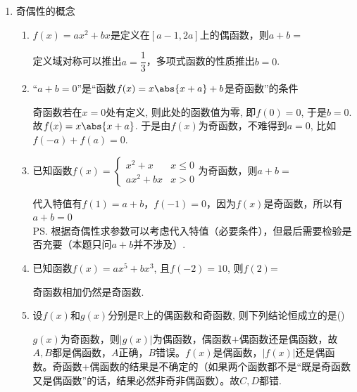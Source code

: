 \begin{enumerate}
\begin{enumerate}
\begin{jieda}
\begin{enumerate}
    \item $y=\dfrac{(x^2+1)^2-(x^2+1)+5}{(x^2+1)^2}=1 - \dfrac{1}{(x^2+1)} + \dfrac{5}{(x^2+1)^2}$. \\
    令$t = \dfrac{1}{(x^2+1)}, t \in (0, 1]$，故$y = 5t^2-t+1 \in [\dfrac{19}{20}, 5]$
    \end{enumerate}
    \end{jieda}
\end{enumerate}

\item 奇偶性的概念
\begin{enumerate}
    \item $f(x) = ax^2+bx$是定义在$[a-1, 2a]$上的偶函数，则$a+b = $
    \begin{jieda}
        定义域对称可以推出$a = \dfrac{1}{3}$，多项式函数的性质推出$b = 0$.
    \end{jieda}
    \item “$a+b=0$”是“函数$f(x)=x\abs{x+a}+b$是奇函数”的条件
    \begin{jieda}
    奇函数若在$x=0$处有定义, 则此处的函数值为零, 即$f(0)=0$, 于是$b=0$. \\
    故$f(x)=x\abs{x+a}$. 于是由$f(x)$为奇函数，不难得到$a=0$, 比如$f(-a)+f(a)=0$. 
    \end{jieda}
    \item 已知函数$f(x) = \left \{ \begin{array}{ll}
        x^2 + x & x \leq 0 \\
        ax^2 + bx & x > 0
    \end{array}\right.$为奇函数，则$a+b = $
    \begin{jieda}
        代入特值有$f(1) = a+b$，$f(-1) = 0$，因为$f(x)$是奇函数，所以有$a+b = 0$ \\
        \ps 根据奇偶性求参数可以考虑代入特值（必要条件），但最后需要检验是否充要（本题只问$a+b$并不涉及）.
    \end{jieda}
    \item 已知函数$f(x)=ax^5+bx^3$, 且$f(-2)=10$, 则$f(2)$=
    \begin{jieda}
        奇函数相加仍然是奇函数.
    \end{jieda}
    \item 设$f(x)$和$g(x)$分别是$\mathbb{R}$上的偶函数和奇函数, 则下列结论恒成立的是\dotfill()
    \begin{jieda}
    $g(x)$为奇函数，则$|g(x)|$为偶函数，偶函数$+$偶函数还是偶函数，故$A, B$都是偶函数，$A$正确，$B$错误。$f(x)$是偶函数，$|f(x)|$还是偶函数。奇函数$+$偶函数的结果是不确定的（如果两个函数都不是“既是奇函数又是偶函数”的话，结果必然非奇非偶函数）。故$C,D$都错.

\end{jieda}
\end{enumerate}
\end{enumerate}
